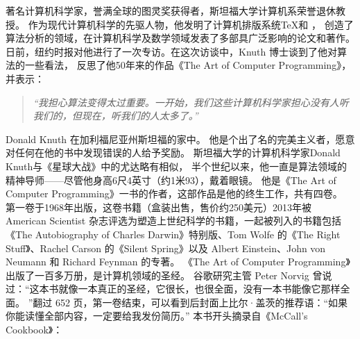 \documentclass[12pt]{ctexart}
\begin{document}
\noindent
{}
\makebox[\textwidth][c]{\rule[1pt]{0.8\textwidth}{1pt}}
\begin{multicols}{2}
著名计算机科学家，誉满全球的图灵奖获得者，斯坦福大学计算机系荣誉退休教授。
作为现代计算机科学的先驱人物，他发明了计算机排版系统\TeX 和 \MF，
创造了算法分析的领域，在计算机科学及数学领域发表了多部具广泛影响的论文和著作。
日前，纽约时报对他进行了一次专访。在这次访谈中，Knuth 博士谈到了他对算法的一些看法，
反思了他50年来的作品《The Art of Computer Programming》，
并表示：
\begin{quote}
\em
“我担心算法变得太过重要。一开始，我们这些计算机科学家担心没有人听我们的，但现在，听我们的人太多了。” 
\end{quote}

Donald Knuth 在加利福尼亚州斯坦福的家中。
他是个出了名的完美主义者，愿意对任何在他的书中发现错误的人给予奖励。
斯坦福大学的计算机科学家Donald Knuth与《星球大战》中的尤达略有相似，
半个世纪以来，他一直是算法领域的精神导师——尽管他身高6尺4英寸（约1米93），戴着眼镜。
他是《The Art of Computer Programming》一书的作者，这部作品是他的终生工作，共有四卷。
第一卷于1968年出版，这卷书籍（盒装出售，售价约250美元）2013年被 American Scientist 杂志评选为塑造上世纪科学的书籍，一起被列入的书籍包括《The Autobiography of Charles Darwin》特别版、Tom Wolfe 的《The Right Stuff》、Rachel Carson 的《Silent Spring》以及 Albert Einstein、John von Neumann 和 Richard Feynman 的专著。
《The Art of Computer Programming》出版了一百多万册，是计算机领域的圣经。
谷歌研究主管 Peter Norvig 曾说过：“这本书就像一本真正的圣经，它很长，也很全面，没有一本书能像它那样全面。
”翻过 652 页，第一卷结束，可以看到后封面上比尔·盖茨的推荐语：“如果你能读懂全部内容，一定要给我发份简历。”
本书开头摘录自《McCall’s Cookbook》：


\end{multicols}
\end{document}
